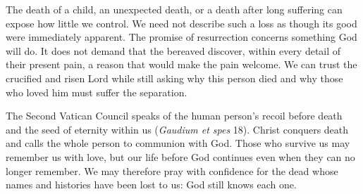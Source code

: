 The death of a child, an unexpected death, or a death after long suffering can expose how little we control. We need not describe such a loss as though its good were immediately apparent. The promise of resurrection concerns something God will do. It does not demand that the bereaved discover, within every detail of their present pain, a reason that would make the pain welcome. We can trust the crucified and risen Lord while still asking why this person died and why those who loved him must suffer the separation.

The Second Vatican Council speaks of the human person's recoil before death and the seed of eternity within us (\emph{Gaudium et spes} 18). Christ conquers death and calls the whole person to communion with God. Those who survive us may remember us with love, but our life before God continues even when they can no longer remember. We may therefore pray with confidence for the dead whose names and histories have been lost to us: God still knows each one.

